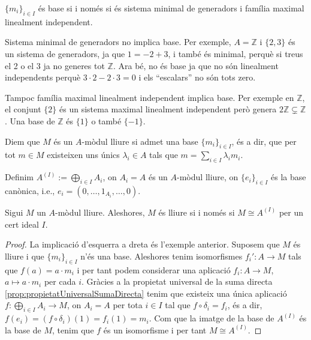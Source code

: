\documentclass[../../../main.tex]{subfiles}
\begin{document}
\begin{prop}
$\{m_i\}_{i\in I}$ és base si i només si és sistema minimal de generadors i família maximal linealment independent.
\end{prop}

Sistema minimal de generadors no implica base. Per exemple, $A = \mathbb{Z}$ i $\{2,3\}$ és un sistema de generadors, ja que $1 = -2+3$, i també és minimal, perquè si treus el 2 o el 3 ja no generes tot $\mathbb{Z}$. Ara bé, no és base ja que no són linealment independents perquè $3\cdotp 2 - 2\cdotp 3 = 0$ i els ``escalars'' no són tots zero.

Tampoc família maximal linealment independent implica base. Per exemple en $\mathbb{Z}$, el conjunt $\{2\}$ és un sistema maximal linealment independent però genera $2\mathbb{Z}\varsubsetneq \mathbb{Z}$. Una base de $\mathbb{Z}$ és $\{1\}$ o també $\{-1\}$.


\begin{defi}
\label{def:modulLliure} Diem que $M$ és un $A$-mòdul lliure si admet una base $\{m_i\}_{i\in I}$, és a dir, que per tot $m\in M$ existeixen uns únics $\lambda_i\in A$ tals que $m = \sum_{i\in I}\lambda_im_i$.
\end{defi}

\begin{ej}
Definim $A^{(I)}:=\bigoplus_{i\in I}A_i$, on $A_i = A$ és un $A$-mòdul lliure, on $\{e_i\}_{i\in I}$ és la base canònica, i.e., $e_i = (0,\ldots,1_{A_i},\ldots,0)$.
\end{ej}

\begin{prop}
\label{prop:baseModulLliure} Sigui $M$ un $A$-mòdul lliure. Aleshores, $M$ és lliure si i només si $M\cong A^{(I)}$ per un cert ideal $I$.
\end{prop}
\begin{proof}
La implicació d'esquerra a dreta és l'exemple anterior. Suposem que $M$ és lliure i que $\{m_i\}_{i\in I}$ n'és una base. Aleshores tenim isomorfismes $f_i':A\to M$ tals que $f(a) = a\cdotp m_i$ i per tant podem considerar una aplicació $f_i:A\to M$, $a\mapsto a\cdotp m_i$ per cada $i$. Gràcies a la propietat universal de la suma directa \ref{prop:propietatUniversalSumaDirecta} tenim que existeix una única aplicació $f:\bigoplus_{i\in I}A_i\to M$, on $A_i = A$ per tota $i\in I$ tal que $f\circ \delta_i = f_i$, és a dir, $f(e_i) = (f\circ \delta_i)(1) = f_i(1) = m_i$. Com que la imatge de la base de $A^{(I)}$ és la base de $M$, tenim que $f$ és un isomorfisme i per tant $M\cong A^{(I)}$.
\end{proof}
\end{document}
